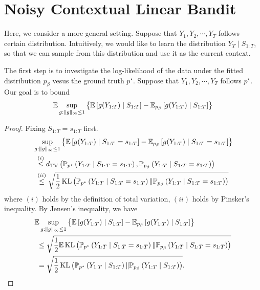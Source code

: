 \documentclass[letterpaper,11pt]{article}
\begin{document}
\section{Noisy Contextual Linear Bandit}

Here, we consider a more general setting. 
Suppose that $Y_1, Y_2, \cdots, Y_T$ follows certain distribution. 
Intuitively, we would like to learn the distribution $Y_T \mid S_{1:T}$, so that we can sample from this distribution and use it as the current context. 

The first step is to investigate the log-likelihood of the data under the fitted distribution $p_{\beta}$ vesus the ground truth $p^\star$. 
Suppose that $Y_1, Y_2, \cdots, Y_T$ follows $p^\star$. 
Our goal is to bound
\begin{equation*}
    \E \sup_{g: \|g\|_{\infty} \leq 1} \left\{\E \left[g(Y_{1:T}) \mid S_{1:T}\right] - \E_{p_\beta} \left[ g(Y_{1:T}) \mid S_{1:T} \right] \right\} %
\end{equation*}

\begin{proof}
    Fixing $S_{1:T} = s_{1:T}$ first. 
    \begin{equation*}
    \begin{aligned}
        &\sup_{g: \|g\|_{\infty} \leq 1} \left\{\mathbb{E} \left[g(Y_{1:T}) \mid S_{1:T} = s_{1:T}\right] - \mathbb{E}_{p_\beta} \left[ g(Y_{1:T}) \mid S_{1:T} = s_{1:T} \right] \right\} \\
        &~\stackrel{(i)}{\leq} d_{\mathrm{TV}}\left(\mathbb{P}_{p^\star}\left(Y_{1:T} \mid S_{1:T} = s_{1:T}\right), \mathbb{P}_{p_\beta}\left(Y_{1:T} \mid S_{1:T} = s_{1:T}\right)\right)\\
        &~\stackrel{(ii)}{\leq} \sqrt{\frac{1}{2} \operatorname{KL}\left(\mathbb{P}_{p^\star}\left(Y_{1:T} \mid S_{1:T} = s_{1:T}\right) \| \mathbb{P}_{p_\beta}\left(Y_{1:T} \mid S_{1:T} = s_{1:T}\right)\right)}
    \end{aligned}
    \end{equation*}
    where $(i)$ holds by the definition of total variation, $(ii)$ holds by Pinsker's inequality. 
    By Jensen's inequality, we have 
    \begin{equation*}
    \begin{aligned}
        &\mathbb{E} \sup_{g: \|g\|_{\infty} \leq 1} \left\{\mathbb{E} \left[g(Y_{1:T}) \mid S_{1:T}\right] - \mathbb{E}_{p_\beta} \left[ g(Y_{1:T}) \mid S_{1:T} \right] \right\} \\
        &~\leq \sqrt{\frac{1}{2} \mathbb{E} \operatorname{KL}\left(\mathbb{P}_{p^\star}\left(Y_{1:T} \mid S_{1:T} = s_{1:T}\right) \| \mathbb{P}_{p_\beta}\left(Y_{1:T} \mid S_{1:T} = s_{1:T}\right)\right)}\\
        &~= \sqrt{\frac{1}{2} \operatorname{KL}\left(\mathbb{P}_{p^\star}\left(Y_{1:T} \mid S_{1:T} \right) \| \mathbb{P}_{p_\beta}\left(Y_{1:T} \mid S_{1:T} \right)\right)}.
    \end{aligned}
    \end{equation*}
\end{proof}
\end{document}
